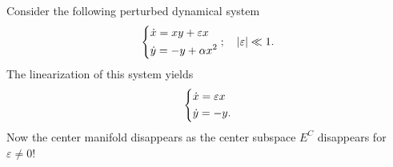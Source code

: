 \begin{ex}
	Consider the following perturbed dynamical system
	\begin{align}
		\begin{dcases}
			\dot{x} = xy + \varepsilon x \\
			\dot{y} = -y + \alpha x^2
		\end{dcases}
;\quad |\varepsilon | \ll 1.
	\end{align}
The linearization of this system yields
\begin{align}
	\begin{dcases}
		\dot{x} = \varepsilon x \\
		\dot{y} = -y.
	\end{dcases}
\end{align}
Now the center manifold disappears as the center subspace $E^{C}$ disappears for $\varepsilon\neq 0$!
\end{ex}

